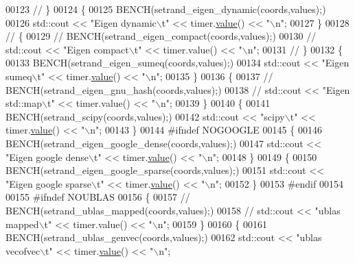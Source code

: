 \begin{DoxyCode}
00123 \textcolor{comment}{//     \}}
00124     \{
00125       BENCH(setrand\_eigen\_dynamic(coords,values);)
00126       std::cout << \textcolor{stringliteral}{"Eigen dynamic\(\backslash\)t"} << timer.\hyperlink{class_eigen_1_1_bench_timer_a26760f963ed8b64c126159bfea57735e}{value}() << \textcolor{stringliteral}{"\(\backslash\)n"};
00127     \}
00128 \textcolor{comment}{//     \{}
00129 \textcolor{comment}{//       BENCH(setrand\_eigen\_compact(coords,values);)}
00130 \textcolor{comment}{//       std::cout << "Eigen compact\(\backslash\)t" << timer.value() << "\(\backslash\)n";}
00131 \textcolor{comment}{//     \}}
00132     \{
00133       BENCH(setrand\_eigen\_sumeq(coords,values);)
00134       std::cout << \textcolor{stringliteral}{"Eigen sumeq\(\backslash\)t"} << timer.\hyperlink{class_eigen_1_1_bench_timer_a26760f963ed8b64c126159bfea57735e}{value}() << \textcolor{stringliteral}{"\(\backslash\)n"};
00135     \}
00136     \{
00137 \textcolor{comment}{//       BENCH(setrand\_eigen\_gnu\_hash(coords,values);)}
00138 \textcolor{comment}{//       std::cout << "Eigen std::map\(\backslash\)t" << timer.value() << "\(\backslash\)n";}
00139     \}
00140     \{
00141       BENCH(setrand\_scipy(coords,values);)
00142       std::cout << \textcolor{stringliteral}{"scipy\(\backslash\)t"} << timer.\hyperlink{class_eigen_1_1_bench_timer_a26760f963ed8b64c126159bfea57735e}{value}() << \textcolor{stringliteral}{"\(\backslash\)n"};
00143     \}
00144 \textcolor{preprocessor}{    #ifndef NOGOOGLE}
00145     \{
00146       BENCH(setrand\_eigen\_google\_dense(coords,values);)
00147       std::cout << \textcolor{stringliteral}{"Eigen google dense\(\backslash\)t"} << timer.\hyperlink{class_eigen_1_1_bench_timer_a26760f963ed8b64c126159bfea57735e}{value}() << \textcolor{stringliteral}{"\(\backslash\)n"};
00148     \}
00149     \{
00150       BENCH(setrand\_eigen\_google\_sparse(coords,values);)
00151       std::cout << \textcolor{stringliteral}{"Eigen google sparse\(\backslash\)t"} << timer.\hyperlink{class_eigen_1_1_bench_timer_a26760f963ed8b64c126159bfea57735e}{value}() << \textcolor{stringliteral}{"\(\backslash\)n"};
00152     \}
00153 \textcolor{preprocessor}{    #endif}
00154 
00155 \textcolor{preprocessor}{    #ifndef NOUBLAS}
00156     \{
00157 \textcolor{comment}{//       BENCH(setrand\_ublas\_mapped(coords,values);)}
00158 \textcolor{comment}{//       std::cout << "ublas mapped\(\backslash\)t" << timer.value() << "\(\backslash\)n";}
00159     \}
00160     \{
00161       BENCH(setrand\_ublas\_genvec(coords,values);)
00162       std::cout << \textcolor{stringliteral}{"ublas vecofvec\(\backslash\)t"} << timer.\hyperlink{class_eigen_1_1_bench_timer_a26760f963ed8b64c126159bfea57735e}{value}() << \textcolor{stringliteral}{"\(\backslash\)n"};

\end{DoxyCode}
